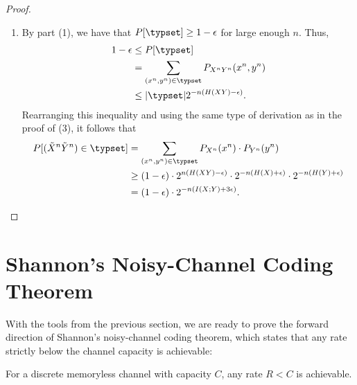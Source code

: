 \begin{proof}
\begin{enumerate}
\begin{align}
\end{align}
Combining this with part (2) of this theorem, we get
\begin{align}
P[(\tilde{X}^n\tilde{Y}^n) \in \typset] &\leq 2^{n(H(XY) + \epsilon)} \cdot 2^{-n(H(X) - \epsilon)} \cdot 2^{-n(H(Y)-\epsilon)}\nonumber\\
&= 2^{-n(-H(XY) + H(X) + H(Y) -3\epsilon)}\nonumber\\
&= 2^{-n(I(X;Y) - 3\epsilon)}.
\end{align}
This completes the proof of the third part.
\item By part (1), we have that $P[\typset] \geq 1 - \epsilon$ for large enough $n$. Thus,
\begin{align}
1-\epsilon &\leq P[\typset]\nonumber\\
&= \sum_{(x^n,y^n) \in \typset} P_{X^nY^n}(x^n,y^n)\nonumber\\
&\leq |\typset| 2^{-n(H(XY) - \epsilon)}.
\end{align}
Rearranging this inequality and using the same type of derivation as in the proof of (3), it follows that
\begin{align}
P[(\tilde{X}^n\tilde{Y}^n) \in \typset]
&= \sum_{(x^n,y^n) \in \typset} P_{X^n}(x^n) \cdot P_{Y^n}(y^n)\nonumber\\
&\geq (1-\epsilon) \cdot 2^{n(H(XY) - \epsilon)} \cdot 2^{-n(H(X) + \epsilon)} \cdot 2^{-n(H(Y) + \epsilon)}\nonumber\\
&= (1 - \epsilon) \cdot 2^{-n(I(X;Y) + 3\epsilon)}.
\end{align}
\end{enumerate}
\end{proof}

\section{Shannon's Noisy-Channel Coding Theorem}
With the tools from the previous section, we are ready to prove the forward direction of Shannon's noisy-channel coding theorem, which states that any rate strictly below the channel capacity is achievable:

\begin{theorem}\label{thm:ncc-forward}
For a discrete memoryless channel with capacity $C$, any rate $R < C$ is achievable.
\end{theorem}

